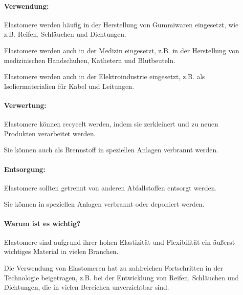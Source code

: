 \documentclass{article}
\begin{document}
\begin{multicols}{3}
\paragraph{Verwendung:}
\begin{compactitem}
\item Elastomere werden häufig in der Herstellung von Gummiwaren eingesetzt, wie z.B. Reifen, Schläuchen und Dichtungen.
\item Elastomere werden auch in der Medizin eingesetzt, z.B. in der Herstellung von medizinischen Handschuhen, Kathetern und Blutbeuteln.
\item Elastomere werden auch in der Elektroindustrie eingesetzt, z.B. als Isoliermaterialien für Kabel und Leitungen.
\end{compactitem}

\paragraph{Verwertung:}
\begin{compactitem}
\item Elastomere können recycelt werden, indem sie zerkleinert und zu neuen Produkten verarbeitet werden.
\item Sie können auch als Brennstoff in speziellen Anlagen verbrannt werden.
\end{compactitem}

\paragraph{Entsorgung:}
\begin{compactitem}
\item Elastomere sollten getrennt von anderen Abfallstoffen entsorgt werden.
\item Sie können in speziellen Anlagen verbrannt oder deponiert werden.
\end{compactitem}

\paragraph{Warum ist es wichtig?}
\begin{compactitem}
\item Elastomere sind aufgrund ihrer hohen Elastizität und Flexibilität ein äußerst wichtiges Material in vielen Branchen.
\item Die Verwendung von Elastomeren hat zu zahlreichen Fortschritten in der Technologie beigetragen, z.B. bei der Entwicklung von Reifen, Schläuchen und Dichtungen, die in vielen Bereichen unverzichtbar sind.
\end{compactitem}


\end{multicols}
\end{document}
